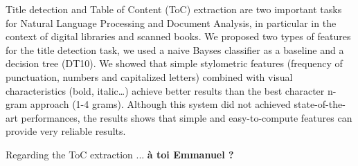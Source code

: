 Title detection and Table of Content (ToC) extraction are two important tasks for Natural Language Processing and Document Analysis, in particular in the context of digital libraries and scanned books.
We proposed two types of features for the title detection task, we used a naive Bayses classifier as a baseline and a decision tree (DT10). We showed that simple stylometric features (frequency of punctuation, numbers and capitalized letters) combined with visual characteristics  (bold, italic\dots) achieve better results than the best character n-gram approach (1-4 grams).
Although this system did not achieved state-of-the-art performances, the results shows that simple and easy-to-compute features can provide very reliable results.

Regarding the ToC extraction ... \textbf{à toi Emmanuel ?}